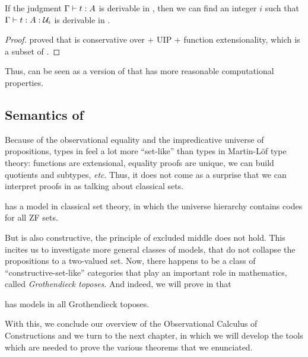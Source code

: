 \begin{theorem}[Embedding]
	If the judgment \( \Gamma \vdash t : A \) is derivable in \ETT, then
	we can find an integer \( i \) such that \( \Gamma \vdash t : A : \mathcal{U}_i \)
	is derivable in \SetoidCC. 
\end{theorem} 

\begin{proof}
 proved that \ETT is conservative over \MLTT + UIP + 
function extensionality, which is a subset of \SetoidCC.
\end{proof}

Thus, \SetoidCC can be seen as a version of \ETT that has more reasonable 
computational properties.

\subsection{Semantics of \SetoidCC}

Because of the observational equality and the impredicative universe of 
propositions, types in \SetoidCC feel a lot more ``set-like'' than types
in Martin-Löf type theory: functions are extensional, equality 
proofs are unique, we can build quotients and subtypes, \textit{etc}.
% 
Thus, it does not come as a surprise that we can interpret proofs in 
\SetoidCC as talking about classical sets.

\begin{theorem}
	\SetoidCC has a model in classical set theory, in which the universe
	hierarchy contains codes for all ZF sets.
\end{theorem}

But \SetoidCC is also constructive, \ie the principle of excluded middle
does not hold. 
% 
This incites us to investigate more general classes of models, that do not 
collapse the propositions to a two-valued set. Now, there happens to be a
class of ``constructive-set-like'' categories that play an important role
in mathematics, called \emph{Grothendieck toposes}. And indeed, we will
prove in  that

\begin{theorem}
	\SetoidCC has models in all Grothendieck toposes.
\end{theorem}

With this, we conclude our overview of the Observational Calculus of 
Constructions and we turn to the next chapter, in which we will develop the
tools which are needed to prove the various theorems that we enunciated.

